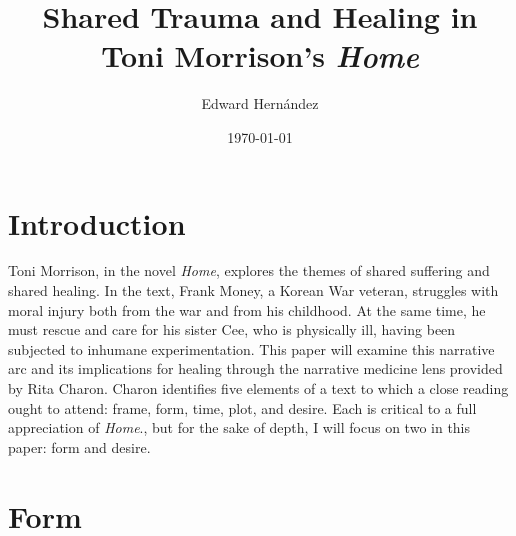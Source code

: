 \documentclass[12pt]{article}
\begin{document}
\title{Shared Trauma and Healing in Toni Morrison's \emph{Home}}
\author{Edward Hern\'{a}ndez}
\date{\today}

\maketitle


\vspace{12pt}

\section{Introduction} Toni Morrison, in the novel
\emph{Home}\autocite{Morrison12}, explores the themes of shared suffering and
shared healing. In the text, Frank Money, a Korean War veteran, struggles with
moral injury both from the war and from his childhood. At the same time, he
must rescue and care for his sister Cee, who is physically ill, having been
subjected to inhumane experimentation.  This paper will examine this narrative
arc and its implications for healing through the narrative medicine lens
provided by Rita Charon.\autocite[ch.~6]{Charon06} Charon identifies five
elements of a text to which a close reading ought to attend: frame, form, time,
plot, and desire. Each is critical to a full appreciation of \emph{Home}., but
for the sake of depth, I will focus on two in this paper: form and desire.

\section{Form}
\end{document}
